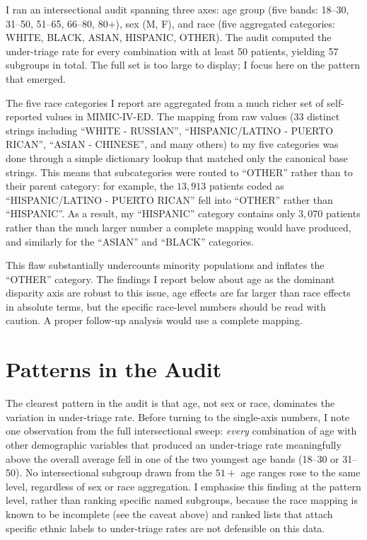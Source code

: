 I ran an intersectional audit spanning three axes: age group (five bands: 18--30, 31--50, 51--65, 66--80, 80+), sex (M, F), and race (five aggregated categories: WHITE, BLACK, ASIAN, HISPANIC, OTHER). The audit computed the under-triage rate for every combination with at least 50 patients, yielding 57 subgroups in total. The full set is too large to display; I focus here on the pattern that emerged.

\begin{notebox}
The five race categories I report are aggregated from a much richer set of self-reported values in MIMIC-IV-ED. The mapping from raw values (33 distinct strings including ``WHITE - RUSSIAN'', ``HISPANIC/LATINO - PUERTO RICAN'', ``ASIAN - CHINESE'', and many others) to my five categories was done through a simple dictionary lookup that matched only the canonical base strings. This means that subcategories were routed to ``OTHER'' rather than to their parent category: for example, the $13{,}913$ patients coded as ``HISPANIC/LATINO - PUERTO RICAN'' fell into ``OTHER'' rather than ``HISPANIC''. As a result, my ``HISPANIC'' category contains only $3{,}070$ patients rather than the much larger number a complete mapping would have produced, and similarly for the ``ASIAN'' and ``BLACK'' categories.

This flaw substantially undercounts minority populations and inflates the ``OTHER'' category. The findings I report below about age as the dominant disparity axis are robust to this issue, age effects are far larger than race effects in absolute terms, but the specific race-level numbers should be read with caution. A proper follow-up analysis would use a complete mapping.
\end{notebox}

\section{Patterns in the Audit}

The clearest pattern in the audit is that age, not sex or race, dominates the variation in under-triage rate. Before turning to the single-axis numbers, I note one observation from the full intersectional sweep: \emph{every} combination of age with other demographic variables that produced an under-triage rate meaningfully above the overall average fell in one of the two youngest age bands (18--30 or 31--50). No intersectional subgroup drawn from the $51+$ age ranges rose to the same level, regardless of sex or race aggregation. I emphasise this finding at the pattern level, rather than ranking specific named subgroups, because the race mapping is known to be incomplete (see the caveat above) and ranked lists that attach specific ethnic labels to under-triage rates are not defensible on this data.

